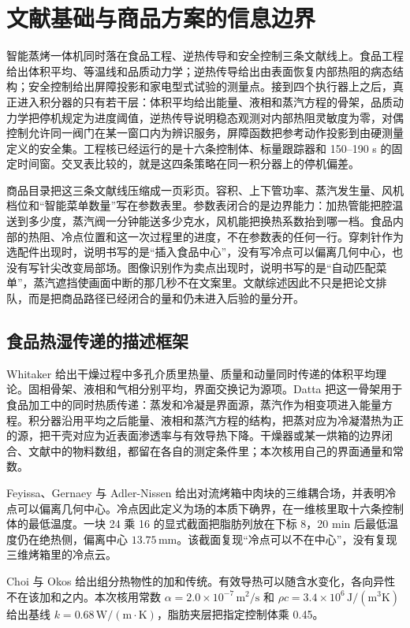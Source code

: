\chapter{文献基础与商品方案的信息边界}
\label{ch:lit}

智能蒸烤一体机同时落在食品工程、逆热传导和安全控制三条文献线上。食品工程给出体积平均、等温线和品质动力学；逆热传导给出由表面恢复内部热阻的病态结构；安全控制给出屏障投影和家电型式试验的测量点。接到四个执行器上之后，真正进入积分器的只有若干层：体积平均给出能量、液相和蒸汽方程的骨架，品质动力学把停机规定为进度阈值，逆热传导说明稳态观测对内部热阻灵敏度为零，对偶控制允许同一阀门在某一窗口内为辨识服务，屏障函数把参考动作投影到由硬测量定义的安全集。工程核已经运行的是十六条控制体、标量跟踪器和 150--190 s 的固定时间窗。交叉表比较的，就是这四条策略在同一积分器上的停机偏差。

商品目录把这三条文献线压缩成一页彩页。容积、上下管功率、蒸汽发生量、风机档位和“智能菜单数量”写在参数表里。参数表闭合的是边界能力：加热管能把腔温送到多少度，蒸汽阀一分钟能送多少克水，风机能把换热系数抬到哪一档。食品内部的热阻、冷点位置和这一次过程里的进度，不在参数表的任何一行。穿刺针作为选配件出现时，说明书写的是“插入食品中心”，没有写冷点可以偏离几何中心，也没有写针尖改变局部场。图像识别作为卖点出现时，说明书写的是“自动匹配菜单”，蒸汽遮挡使画面中断的那几秒不在文案里。文献综述因此不只是把论文排队，而是把商品路径已经闭合的量和仍未进入后验的量分开。

\section{食品热湿传递的描述框架}

Whitaker 给出干燥过程中多孔介质里热量、质量和动量同时传递的体积平均理论\cite{whitaker1977}。固相骨架、液相和气相分别平均，界面交换记为源项。Datta 把这一骨架用于食品加工中的同时热质传递\cite{datta2007}：蒸发和冷凝是界面源，蒸汽作为相变项进入能量方程。积分器沿用平均之后能量、液相和蒸汽方程的结构，把蒸对应为冷凝潜热为正的源，把干壳对应为近表面渗透率与有效导热下降。干燥器或某一烘箱的边界闭合、文献中的物料数组，都留在各自的测定条件里；本次核用自己的界面通量和常数。

Feyissa、Gernaey 与 Adler-Nissen 给出对流烤箱中肉块的三维耦合场，并表明冷点可以偏离几何中心\cite{feyissa2013}。冷点因此定义为场的本质下确界，在一维核里取十六条控制体的最低温度。一块 24 乘 16 的显式截面把脂肪列放在下标 8，20 min 后最低温度仍在绝热侧，偏离中心 \(13.75\,\mathrm{mm}\)。该截面复现“冷点可以不在中心”，没有复现三维烤箱里的冷点云。

Choi 与 Okos 给出组分热物性的加和传统\cite{choi1986}。有效导热可以随含水变化，各向异性不在该加和之内。本次核用常数 \(\alpha=2.0\times 10^{-7}\,\mathrm{m}^2/\mathrm{s}\) 和 \(\rho c=3.4\times 10^{6}\,\mathrm{J}/(\mathrm{m}^3\mathrm{K})\) 给出基线 \(k=0.68\,\mathrm{W}/(\mathrm{m\cdot K})\)，脂肪夹层把指定控制体乘 0.45。

